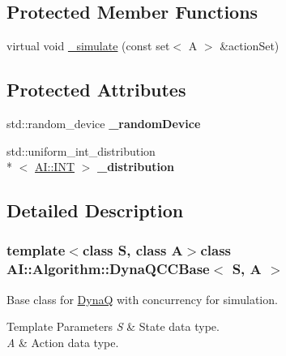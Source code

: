\subsection*{Protected Member Functions}
\begin{DoxyCompactItemize}
\item 
virtual void \hyperlink{classAI_1_1Algorithm_1_1DynaQCCBase_adc1bb07bb9025dc0c2963ded741b43a2}{\-\_\-simulate} (const set$<$ A $>$ \&action\-Set)
\end{DoxyCompactItemize}
\subsection*{Protected Attributes}
\begin{DoxyCompactItemize}
\item 
\hypertarget{classAI_1_1Algorithm_1_1DynaQCCBase_a0826c4c68c5d7b11bcb560d1b23b3252}{std\-::random\-\_\-device {\bfseries \-\_\-random\-Device}}\label{classAI_1_1Algorithm_1_1DynaQCCBase_a0826c4c68c5d7b11bcb560d1b23b3252}

\item 
\hypertarget{classAI_1_1Algorithm_1_1DynaQCCBase_ab2859ca39decdd0a8921e0ac500ed6f3}{std\-::uniform\-\_\-int\-\_\-distribution\\*
$<$ \hyperlink{namespaceAI_ac74584e573f07aa4194b461b1ba7be64}{A\-I\-::\-I\-N\-T} $>$ {\bfseries \-\_\-distribution}}\label{classAI_1_1Algorithm_1_1DynaQCCBase_ab2859ca39decdd0a8921e0ac500ed6f3}

\end{DoxyCompactItemize}


\subsection{Detailed Description}
\subsubsection*{template$<$class S, class A$>$class A\-I\-::\-Algorithm\-::\-Dyna\-Q\-C\-C\-Base$<$ S, A $>$}

Base class for \hyperlink{classAI_1_1Algorithm_1_1DynaQ}{Dyna\-Q} with concurrency for simulation. 


\begin{DoxyTemplParams}{Template Parameters}
{\em S} & State data type. \\
\hline
{\em A} & Action data type. \\
\hline
\end{DoxyTemplParams}


